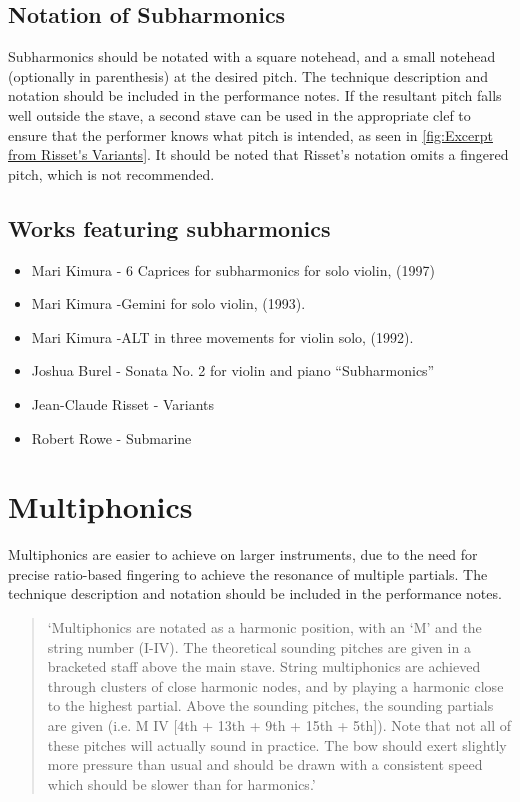 \subsection{Notation of Subharmonics} \label{sec:notation-subharmonics}
Subharmonics should be notated with a square notehead, and a small notehead (optionally in parenthesis) at the desired pitch.
The technique description and notation should be included in the performance notes.
If the resultant pitch falls well outside the stave, a second stave can be used in the appropriate clef to ensure that the performer knows what pitch is intended, as seen in \autoref{fig:Excerpt from Risset's Variants}.\autocite[]{rissetVariants1995}
It should be noted that Risset's notation omits a fingered pitch, which is not recommended.

\subsection{Works featuring subharmonics }\label{sec:subharmonicsLiterature}

\begin{itemize}
    \item Mari Kimura - 6 Caprices for subharmonics for solo violin, (1997) 
    \item Mari Kimura -Gemini for solo violin, (1993).
    \item Mari Kimura -ALT in three movements for violin solo, (1992).
    \item Joshua Burel - Sonata No. 2 for violin and piano “Subharmonics”
    \item Jean-Claude Risset - Variants
    \item Robert Rowe - Submarine
\end{itemize}

\section{Multiphonics} \label{sec:multiphonics}
Multiphonics are easier to achieve on larger instruments, due to the need for precise ratio-based fingering to achieve the resonance of multiple partials.
The technique description and notation should be included in the performance notes.

\begin{quotation}
  `Multiphonics are notated as a harmonic position, with an `M' and the string number (I-IV). 
  The theoretical sounding pitches are given in a bracketed staff above the main stave.
  String multiphonics are achieved through clusters of close harmonic nodes, and by playing a harmonic close to the highest partial.
  Above the sounding pitches, the sounding partials are given (i.e. M IV [4th + 13th + 9th + 15th + 5th]).
  Note that not all of these pitches will actually sound in practice.
  The bow should exert slightly more pressure than usual and should be drawn with a consistent speed which should be slower than for harmonics.'
\end{quotation}

